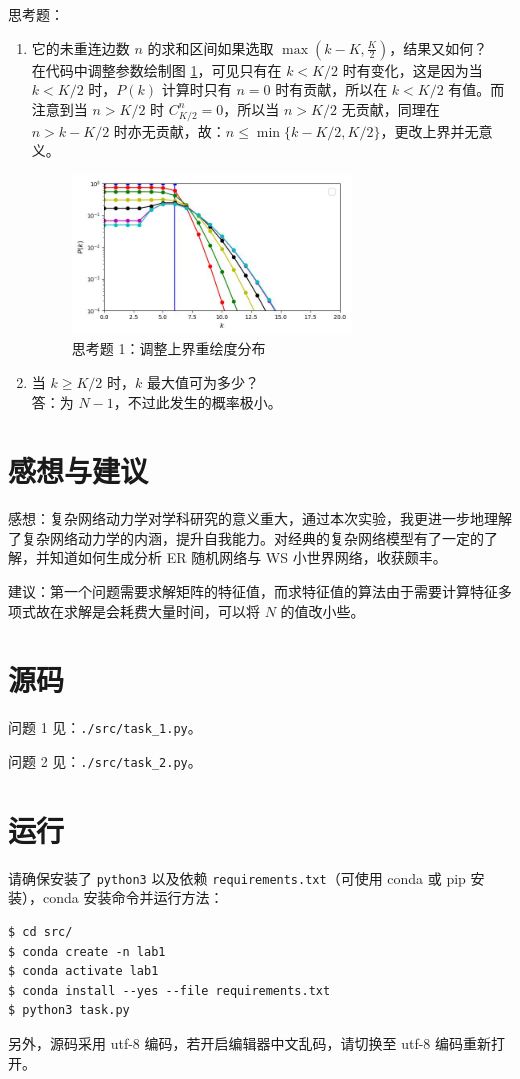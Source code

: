 \documentclass{article}
\begin{document}
思考题：
\begin{enumerate}
    \item 它的未重连边数 $n$ 的求和区间如果选取 $\max(k-K,\frac{K}{2})$，结果又如何？\\
    在代码中调整参数绘制图 \ref{fig:task2_fake}，可见只有在 $k<K/2$ 时有变化，这是因为当 $k<K/2$ 时，$P(k)$ 计算时只有 $n=0$ 时有贡献，所以在 $k<K/2$ 有值。而注意到当 $n>K/2$ 时 $C_{K/2}^{n}=0$，所以当 $n>K/2$ 无贡献，同理在 $n>k-K/2$ 时亦无贡献，故：$n\leq\min\{k-K/2,K/2\}$，更改上界并无意义。
    \begin{figure}[ht]
        \label{fig:task2_fake}
        \centering
        \includegraphics[width=0.7\textwidth]{../task2_fake.jpg}
        \caption{思考题 1：调整上界重绘度分布}
    \end{figure}
    \item 当 $k\geq K/2$ 时，$k$ 最大值可为多少？\\
    答：为 $N-1$，不过此发生的概率极小。
\end{enumerate}

\newpage

\section{感想与建议}

感想：复杂网络动力学对学科研究的意义重大，通过本次实验，我更进一步地理解了复杂网络动力学的内涵，提升自我能力。对经典的复杂网络模型有了一定的了解，并知道如何生成分析 ER 随机网络与 WS 小世界网络，收获颇丰。

建议：第一个问题需要求解矩阵的特征值，而求特征值的算法由于需要计算特征多项式故在求解是会耗费大量时间，可以将 $N$ 的值改小些。

\section{源码}

问题 1 见：\lstinline{./src/task_1.py}。

问题 2 见：\lstinline{./src/task_2.py}。

\section{运行}

请确保安装了 \lstinline{python3} 以及依赖 \lstinline{requirements.txt}（可使用 conda 或 pip 安装），conda 安装命令并运行方法：
\begin{lstlisting}
$ cd src/
$ conda create -n lab1
$ conda activate lab1
$ conda install --yes --file requirements.txt
$ python3 task.py
\end{lstlisting}

另外，源码采用 utf-8 编码，若开启编辑器中文乱码，请切换至 utf-8 编码重新打开。
\end{document}
